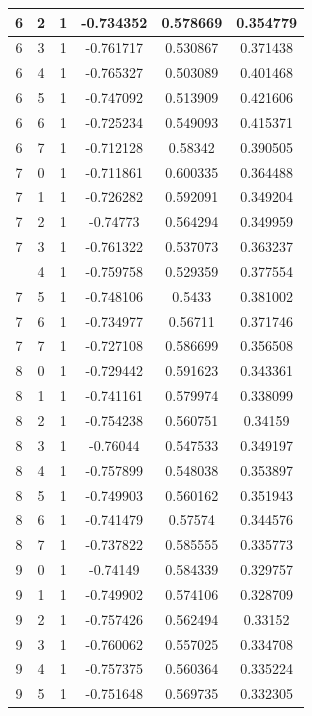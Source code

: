 \documentclass[12pt,a4paper]{article}
\numberwithin{equation}{section}
\numberwithin{figure}{section}
\numberwithin{table}{section}
\begin{document}
\begin{longtable}{|c|c|c|c|c|c|}
6 & 2 & 1 & -0.734352 & 0.578669 & 0.354779 \\ \hline
6 & 3 & 1 & -0.761717 & 0.530867 & 0.371438 \\ \hline
6 & 4 & 1 & -0.765327 & 0.503089 & 0.401468 \\ \hline
6 & 5 & 1 & -0.747092 & 0.513909 & 0.421606 \\ \hline
6 & 6 & 1 & -0.725234 & 0.549093 & 0.415371 \\ \hline
6 & 7 & 1 & -0.712128 & 0.58342 & 0.390505 \\ \hline
7 & 0 & 1 & -0.711861 & 0.600335 & 0.364488 \\ \hline
7 & 1 & 1 & -0.726282 & 0.592091 & 0.349204 \\ \hline
7 & 2 & 1 & -0.74773 & 0.564294 & 0.349959 \\ \hline
7 & 3 & 1 & -0.761322 & 0.537073 & 0.363237 \\ \hline
\pagebreak
7 & 4 & 1 & -0.759758 & 0.529359 & 0.377554 \\ \hline
7 & 5 & 1 & -0.748106 & 0.5433 & 0.381002 \\ \hline
7 & 6 & 1 & -0.734977 & 0.56711 & 0.371746 \\ \hline
7 & 7 & 1 & -0.727108 & 0.586699 & 0.356508 \\ \hline
8 & 0 & 1 & -0.729442 & 0.591623 & 0.343361 \\ \hline
8 & 1 & 1 & -0.741161 & 0.579974 & 0.338099 \\ \hline
8 & 2 & 1 & -0.754238 & 0.560751 & 0.34159 \\ \hline
8 & 3 & 1 & -0.76044 & 0.547533 & 0.349197 \\ \hline
8 & 4 & 1 & -0.757899 & 0.548038 & 0.353897 \\ \hline
8 & 5 & 1 & -0.749903 & 0.560162 & 0.351943 \\ \hline
8 & 6 & 1 & -0.741479 & 0.57574 & 0.344576 \\ \hline
8 & 7 & 1 & -0.737822 & 0.585555 & 0.335773 \\ \hline
9 & 0 & 1 & -0.74149 & 0.584339 & 0.329757 \\ \hline
9 & 1 & 1 & -0.749902 & 0.574106 & 0.328709 \\ \hline
9 & 2 & 1 & -0.757426 & 0.562494 & 0.33152 \\ \hline
9 & 3 & 1 & -0.760062 & 0.557025 & 0.334708 \\ \hline
9 & 4 & 1 & -0.757375 & 0.560364 & 0.335224 \\ \hline
9 & 5 & 1 & -0.751648 & 0.569735 & 0.332305 \\ \hline

\end{longtable}
\end{document}
